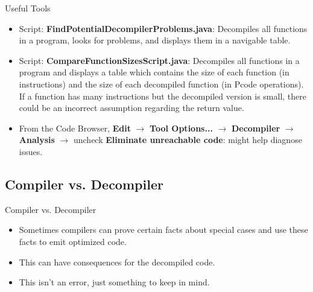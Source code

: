 \documentclass{beamer}
\begin{document}
\begin{frame}
\begin{block}{Useful Tools}
\begin{itemize}
\item Script: \textbf{FindPotentialDecompilerProblems.java}: Decompiles all functions in a program, looks for problems, and displays them in a navigable table.
\item Script: \textbf{CompareFunctionSizesScript.java}: Decompiles all functions in a program and displays a table which contains the size of each function (in instructions) and
the size of each decompiled function (in Pcode operations). If a function has many instructions but the decompiled version is small, there could be an incorrect assumption regarding
the return value.
\item From the Code Browser, \textbf{Edit} $\rightarrow$ \textbf{Tool Options...} $\rightarrow$ \textbf{Decompiler} $\rightarrow$ \textbf{Analysis} $\rightarrow$ uncheck \textbf{Eliminate unreachable code}: might help diagnose issues.
\end{itemize}
\end{block}
\end{frame}


\subsection{Compiler vs. Decompiler}
\begin{frame}
\begin{block}{Compiler vs. Decompiler}
\begin{itemize}
\item Sometimes compilers can prove certain facts about special cases and use these facts to emit optimized code.
\item This can have consequences for the decompiled code.
\item This isn't an error, just something to keep in mind. 
\end{itemize}
\end{block}
\end{frame}
\end{document}
